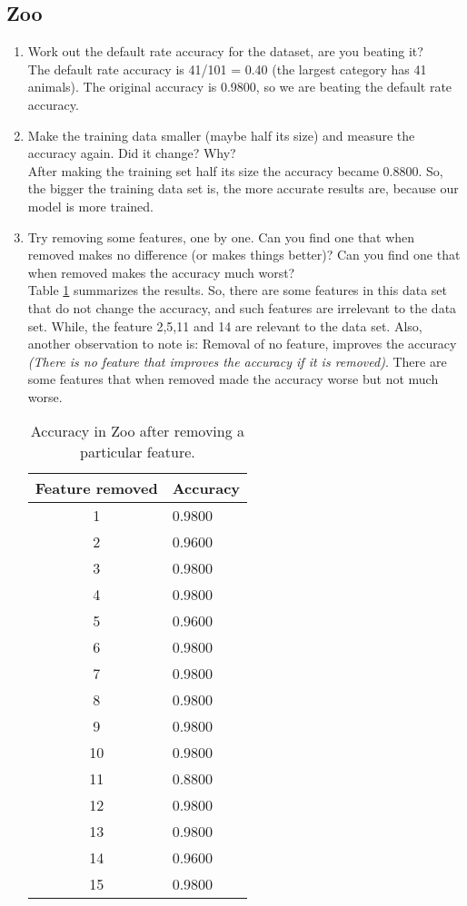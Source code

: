 \documentclass[10pt]{scrartcl}
\begin{document}
\subsection{Zoo}
\begin{enumerate}
 \item Work out the default rate accuracy for the dataset, are you beating it? \\
 The default rate accuracy is 41/101 = 0.40 (the largest category has 41 animals). The original accuracy is 0.9800, so we are beating the default rate accuracy. 
 
 \item Make the training data smaller (maybe half its size) and measure the accuracy again. Did it change? Why? \\ 
 After making the training set half its size the accuracy became 0.8800.  So, the bigger the training data set is, the more accurate results are, because our model is more trained. 
 
 \item Try removing some features, one by one. Can you find one that when removed makes no difference (or makes things better)? Can you find one that when removed makes the accuracy much worst? \\
 Table \ref{tab:acc1} summarizes the results. So, there are some features in this data set that do not change the accuracy, and such features are irrelevant to the data set. While, the feature 2,5,11 and 14 are relevant to the data set. Also, another observation to note is: Removal of no feature, improves the accuracy \textit{(There is no feature that improves the accuracy if it is removed)}. There are some features that when removed made the accuracy worse but not much worse.  

 \begin{table}[h!]
 \centering
 \begin{tabular}{cl}
  \toprule
  \textbf{Feature removed} & \textbf{Accuracy} \\
  \midrule
  1  & 0.9800 \\ 
  2  & 0.9600 \\  
  3  & 0.9800 \\  
  4  & 0.9800 \\  
  5  & 0.9600 \\  
  6  & 0.9800 \\  
  7  & 0.9800 \\  
  8  & 0.9800 \\  
  9  & 0.9800 \\  
  10 & 0.9800 \\ 
  11 & 0.8800 \\ 
  12 & 0.9800 \\ 
  13 & 0.9800 \\ 
  14 & 0.9600 \\ 
  15 & 0.9800 \\ 
  \bottomrule
 \end{tabular}
 \caption{Accuracy in Zoo after removing a particular feature.}\label{tab:acc1}
 \end{table}
 

\end{enumerate}
\end{document}
